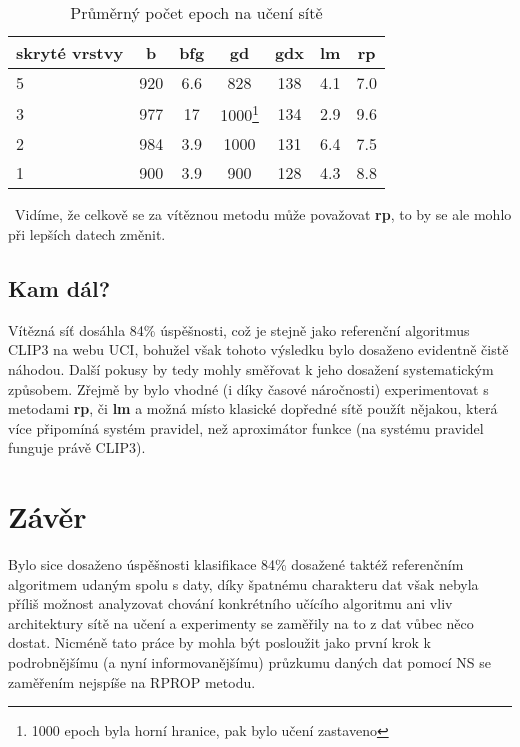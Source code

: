 \documentclass[journal]{IEEEtrancz}
\begin{document}
\begin{table}[h]
  \centering
  \caption{Průměrný počet epoch na učení sítě}
  \begin{tabular}{|l||c|c|c|c|c|c|}
  \hline
  skryté vrstvy & b & bfg & gd & gdx & lm & rp\\
  \hline
  \hline
  5&920&6.6&828&138&4.1&7.0\\
3&977&17&1000\footnote{1000 epoch byla horní hranice, pak bylo učení zastaveno}&134&2.9&9.6\\
2&984&3.9&1000&131&6.4&7.5\\
1&900&3.9&900&128&4.3&8.8\\
  \hline
  \end{tabular}
  \label{tab:klas}
\end{table}
\
Vidíme, že celkově se za vítěznou metodu může považovat \textbf{rp}, to by se ale mohlo při lepších datech změnit.

\subsection{Kam dál?}
Vítězná síť dosáhla 84\% úspěšnosti, což je stejně jako referenční algoritmus CLIP3 na webu UCI, bohužel však tohoto výsledku bylo dosaženo evidentně čistě náhodou. Další pokusy by tedy mohly směřovat k jeho dosažení systematickým způsobem. Zřejmě by bylo vhodné (i díky časové náročnosti) experimentovat s metodami \textbf{rp}, či \textbf{lm} a možná místo klasické dopředné sítě použít nějakou, která více připomíná systém pravidel, než aproximátor funkce (na systému pravidel funguje právě CLIP3).


\section{Závěr}
Bylo sice dosaženo úspěšnosti klasifikace 84\% dosažené taktéž referenčním algoritmem udaným spolu s daty, díky špatnému charakteru dat však nebyla příliš možnost analyzovat chování konkrétního učícího algoritmu ani vliv architektury sítě na učení a experimenty se zaměřily na to z dat vůbec něco dostat. Nicméně tato práce by mohla být posloužit jako první krok k podrobnějšímu (a nyní informovanějšímu) průzkumu daných dat pomocí NS se zaměřením nejspíše na RPROP metodu.
\end{document}
